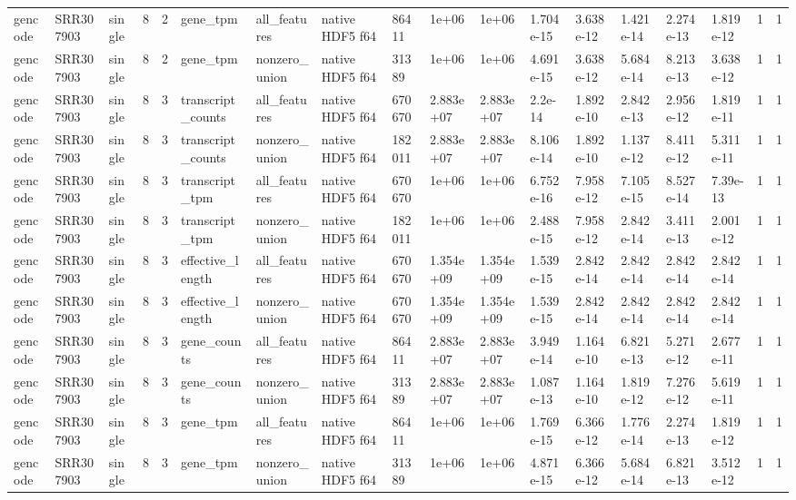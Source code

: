 \begin{tabular}{llllllllllllllllll}
gencode & SRR307903 & single & 8 & 2 & gene\_tpm & all\_features & native HDF5 f64 & 86411 & 1e+06 & 1e+06 & 1.704e-15 & 3.638e-12 & 1.421e-14 & 2.274e-13 & 1.819e-12 & 1 & 1 \\
gencode & SRR307903 & single & 8 & 2 & gene\_tpm & nonzero\_union & native HDF5 f64 & 31389 & 1e+06 & 1e+06 & 4.691e-15 & 3.638e-12 & 5.684e-14 & 8.213e-13 & 3.638e-12 & 1 & 1 \\
gencode & SRR307903 & single & 8 & 3 & transcript\_counts & all\_features & native HDF5 f64 & 670670 & 2.883e+07 & 2.883e+07 & 2.2e-14 & 1.892e-10 & 2.842e-13 & 2.956e-12 & 1.819e-11 & 1 & 1 \\
gencode & SRR307903 & single & 8 & 3 & transcript\_counts & nonzero\_union & native HDF5 f64 & 182011 & 2.883e+07 & 2.883e+07 & 8.106e-14 & 1.892e-10 & 1.137e-12 & 8.411e-12 & 5.311e-11 & 1 & 1 \\
gencode & SRR307903 & single & 8 & 3 & transcript\_tpm & all\_features & native HDF5 f64 & 670670 & 1e+06 & 1e+06 & 6.752e-16 & 7.958e-12 & 7.105e-15 & 8.527e-14 & 7.39e-13 & 1 & 1 \\
gencode & SRR307903 & single & 8 & 3 & transcript\_tpm & nonzero\_union & native HDF5 f64 & 182011 & 1e+06 & 1e+06 & 2.488e-15 & 7.958e-12 & 2.842e-14 & 3.411e-13 & 2.001e-12 & 1 & 1 \\
gencode & SRR307903 & single & 8 & 3 & effective\_length & all\_features & native HDF5 f64 & 670670 & 1.354e+09 & 1.354e+09 & 1.539e-15 & 2.842e-14 & 2.842e-14 & 2.842e-14 & 2.842e-14 & 1 & 1 \\
gencode & SRR307903 & single & 8 & 3 & effective\_length & nonzero\_union & native HDF5 f64 & 670670 & 1.354e+09 & 1.354e+09 & 1.539e-15 & 2.842e-14 & 2.842e-14 & 2.842e-14 & 2.842e-14 & 1 & 1 \\
gencode & SRR307903 & single & 8 & 3 & gene\_counts & all\_features & native HDF5 f64 & 86411 & 2.883e+07 & 2.883e+07 & 3.949e-14 & 1.164e-10 & 6.821e-13 & 5.271e-12 & 2.677e-11 & 1 & 1 \\
gencode & SRR307903 & single & 8 & 3 & gene\_counts & nonzero\_union & native HDF5 f64 & 31389 & 2.883e+07 & 2.883e+07 & 1.087e-13 & 1.164e-10 & 1.819e-12 & 7.276e-12 & 5.619e-11 & 1 & 1 \\
gencode & SRR307903 & single & 8 & 3 & gene\_tpm & all\_features & native HDF5 f64 & 86411 & 1e+06 & 1e+06 & 1.769e-15 & 6.366e-12 & 1.776e-14 & 2.274e-13 & 1.819e-12 & 1 & 1 \\
gencode & SRR307903 & single & 8 & 3 & gene\_tpm & nonzero\_union & native HDF5 f64 & 31389 & 1e+06 & 1e+06 & 4.871e-15 & 6.366e-12 & 5.684e-14 & 6.821e-13 & 3.512e-12 & 1 & 1 \\

\end{tabular}
